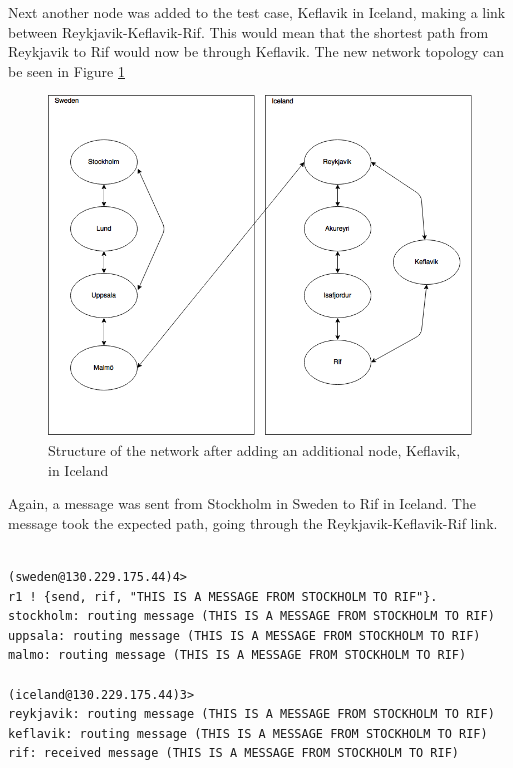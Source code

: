 \documentclass[a4paper, 11pt]{article}
\begin{document}
Next another node was added to the test case, Keflavik in Iceland, making a link between Reykjavik-Keflavik-Rif. This would mean that the shortest path from Reykjavik to Rif would now be through Keflavik. The new network topology can be seen in Figure \ref{fig:dsbc_a2_routy_sweden_iceland-keflavik}

\begin{figure}[h]
  \begin{center}
    \includegraphics[width=\linewidth]{dsbc_a2_routy_sweden_iceland_keflavik.png}
    \caption{Structure of the network after adding an additional node, Keflavik, in Iceland}
    \label{fig:dsbc_a2_routy_sweden_iceland-keflavik}
  \end{center}
\end{figure}

Again, a message was sent from Stockholm in Sweden to Rif in Iceland. The message took the expected path, going through the Reykjavik-Keflavik-Rif link.

\begin{verbatim}

(sweden@130.229.175.44)4> 
r1 ! {send, rif, "THIS IS A MESSAGE FROM STOCKHOLM TO RIF"}.
stockholm: routing message (THIS IS A MESSAGE FROM STOCKHOLM TO RIF)
uppsala: routing message (THIS IS A MESSAGE FROM STOCKHOLM TO RIF)
malmo: routing message (THIS IS A MESSAGE FROM STOCKHOLM TO RIF)

(iceland@130.229.175.44)3>
reykjavik: routing message (THIS IS A MESSAGE FROM STOCKHOLM TO RIF)
keflavik: routing message (THIS IS A MESSAGE FROM STOCKHOLM TO RIF)
rif: received message (THIS IS A MESSAGE FROM STOCKHOLM TO RIF)

\end{verbatim}
\end{document}
